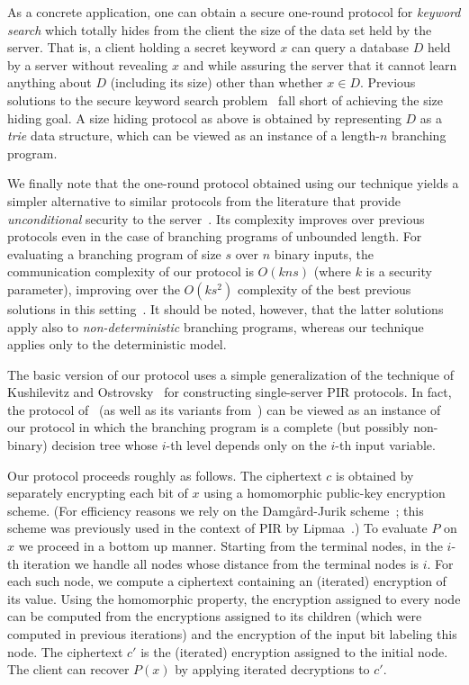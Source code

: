 \documentclass[11pt]{article}
\newcommand{\superparagraph}[1]{\medskip\noindent {\bf #1}}
\begin{document}
As a concrete application, one can obtain a secure one-round
protocol for {\em keyword search} which totally hides from the
client the size of the data set held by the server. That is, a
client holding a secret keyword $x$ can query a database $D$ held by
a server without revealing $x$ and while assuring the server that it
cannot learn anything about $D$ (including its size) other than
whether $x\in D$. Previous solutions to the secure keyword search
problem~\cite{CGN,FIPR05,OS} fall short of achieving the size hiding
goal. A size hiding protocol as above is obtained by representing
$D$ as a {\em trie} data structure, which can be viewed as an
instance of a length-$n$ branching program.

We finally note that the one-round protocol obtained using our
technique yields a simpler alternative to similar protocols from the
literature that provide {\em unconditional} security to the
server~\cite{SYY99,Bea00,IK00,Rap,Kol}. Its complexity improves over
previous protocols even in the case of branching programs of
unbounded length. For evaluating a branching program of size $s$
over $n$ binary inputs, the communication complexity of our protocol
is $O(kns)$ (where $k$ is a security parameter), improving over the
$O(ks^2)$ complexity of the best previous solutions in this
setting~\cite{IK00}. It should be noted, however, that the latter
solutions apply also to {\em non-deterministic} branching programs,
whereas our technique applies only to the deterministic model.

\superparagraph{Techniques.} The basic version of our protocol uses
a simple generalization of the technique of Kushilevitz and
Ostrovsky~\cite{KO97} for constructing single-server PIR protocols.
In fact, the protocol of~\cite{KO97} (as well as its variants
from~\cite{Ste98,L04}) can be viewed as an instance of our protocol
in which the branching program is a complete (but possibly
non-binary) decision tree whose $i$-th level depends only on the
$i$-th input variable.

Our protocol proceeds roughly as follows. The ciphertext $c$ is
obtained by separately encrypting each bit of $x$ using a
homomorphic public-key encryption scheme. (For efficiency reasons we
rely on the Damg{\aa}rd-Jurik scheme~\cite{DJ01}; this scheme was
previously used in the context of PIR by Lipmaa~\cite{L04}.) To
evaluate $P$ on $x$ we proceed in a bottom up manner. Starting from
the terminal nodes, in the $i$-th iteration we handle all nodes
whose distance from the terminal nodes is $i$. For each such node,
we compute a ciphertext containing an (iterated) encryption of its
value. Using the homomorphic property, the encryption assigned to
every node can be computed from the encryptions assigned to its
children (which were computed in previous iterations) and the
encryption of the input bit labeling this node.  The ciphertext $c'$
is the (iterated) encryption assigned to the initial node. The
client can recover $P(x)$ by applying iterated decryptions to $c'$.
\end{document}
